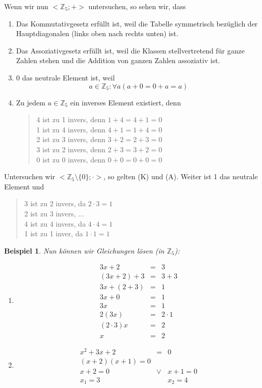 \documentclass{report}
\newtheorem{myexample}{Beispiel}
\begin{document}
Wenn wir nun $< \mathbb{Z}_5 ; + >$ untersuchen, so sehen wir, dass
\begin{enumerate}
\item Das Kommutativgesetz erfüllt ist, weil die Tabelle symmetrisch bezüglich der Hauptdiagonalen (links oben nach rechts unten) ist.
\item Das Assoziativgesetz erfüllt ist, weil die Klassen stellvertretend für ganze Zahlen stehen und die Addition von ganzen Zahlen assoziativ ist.
\item 0 das neutrale Element ist, weil
\begin{equation}a \in \mathbb{Z}_5 : \forall a (a + 0 = 0 + a = a)\end{equation}
\item Zu jedem $a \in \mathbb{Z}_5$ ein inverses Element existiert, denn
\begin{quote}4 ist zu 1 invers, denn $1 + 4 = 4 + 1 = 0$\\
1 ist zu 4 invers, denn $4 + 1 = 1 + 4 = 0$\\
2 ist zu 3 invers, denn $3 + 2 = 2 + 3 = 0$\\
3 ist zu 2 invers, denn $2 + 3 = 3 + 2 = 0$\\
0 ist zu 0 invers, denn $0 + 0 = 0 + 0 = 0$\end{quote}
\end{enumerate}
Untersuchen wir $< \mathbb{Z}_5 \setminus \{0\} ; \cdot >$, so gelten (K) und (A). Weiter ist 1 das neutrale Element und
\begin{quote}3 ist zu 2 invers, da $2 \cdot 3 = 1$\\
2 ist zu 3 invers, ...\\
4 ist zu 4 invers, da $4 \cdot 4 = 1$\\
1 ist zu 1 inver, da $1 \cdot 1 = 1$\end{quote}
\begin{myexample} Nun können wir Gleichungen lösen (in $\mathbb{Z}_5$):
\begin{enumerate}
\item \begin{eqnarray}3x + 2 & = & 3\nonumber \\
(3x + 2) + 3 & = & 3 + 3\nonumber \\
3x + (2 + 3) & = & 1\nonumber \\
3x + 0 & = & 1\nonumber \\
3x & = & 1\nonumber \\
2 (3x) & = & 2 \cdot 1\nonumber \\
(2 \cdot 3) x & = & 2\nonumber \\
x & = & 2\end{eqnarray}
\item \begin{eqnarray}x^2 + 3x + 2 & = & 0\nonumber \\
(x+2)(x+1) = 0\nonumber \\
x + 2 = 0 & \lor & x + 1 = 0\nonumber \\
x_1 = 3 & & x_2 = 4\end{eqnarray}
\end{enumerate}
\end{myexample}
\end{document}
